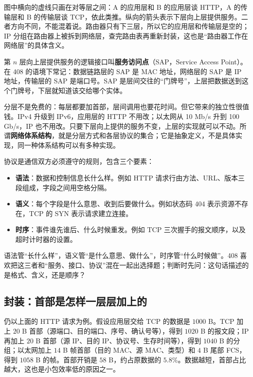 图中横向的虚线只画在对等层之间：A 的应用层和 B 的应用层谈 HTTP，A 的传输层和 B 的传输层谈 TCP，依此类推。纵向的箭头表示下层向上层提供服务。二者方向不同，不能混着说。路由器只有下三层，所以它的应用层和传输层是空的；IP 分组在路由器上被拆到网络层，查完路由表再重新封装，这也是“路由器工作在网络层”的具体含义。

第 $n$ 层向上层提供服务的逻辑接口叫\textbf{服务访问点}（SAP，Service Access Point）。在 408 的语境下常记：数据链路层的 SAP 是 MAC 地址，网络层的 SAP 是 IP 地址，传输层的 SAP 是端口号。SAP 是层间交往的“门牌号”，上层把数据送到这个门牌号，下层就知道该交给哪个实体。

分层不是免费的：每层都要加首部，层间调用也要花时间。但它带来的独立性很值钱。IPv4 升级到 IPv6，应用层的 HTTP 不用改；以太网从 10 Mb/s 升到 100 Gb/s，IP 也不用改。只要下层向上提供的服务不变，上层的实现就可以不动。所谓\textbf{网络体系结构}，就是分层方式和各层协议的集合；它是抽象定义，不是具体实现，同一种体系结构可以有多种实现。

协议是通信双方必须遵守的规则，包含三个要素：
\begin{itemize}
  \item \textbf{语法}：数据和控制信息长什么样。例如 HTTP 请求行由方法、URL、版本三段组成，字段之间用空格分隔。
  \item \textbf{语义}：每个字段是什么意思、收到后要做什么。例如状态码 404 表示资源不存在，TCP 的 SYN 表示请求建立连接。
  \item \textbf{时序}：事件谁先谁后、什么时候重发。例如 TCP 三次握手的报文顺序，以及超时计时器的设置。
\end{itemize}

\begin{attention}
语法管“长什么样”，语义管“是什么意思、做什么”，时序管“什么时候做”。408 喜欢把这三者和“服务、接口、协议”混在一起出选择题；判断时先问：这句话描述的是格式、含义，还是顺序？
\end{attention}

\subsection{封装：首部是怎样一层层加上的}

仍以上面的 HTTP 请求为例。假设应用层交给 TCP 的数据是 $1000$ B。TCP 加上 $20$ B 首部（源端口、目的端口、序号、确认号等），得到 $1020$ B 的报文段；IP 再加上 $20$ B 首部（源 IP、目的 IP、协议号、生存时间等），得到 $1040$ B 的分组；以太网加上 $14$ B 帧首部（目的 MAC、源 MAC、类型）和 $4$ B 尾部 FCS，得到 $1058$ B 的帧。首部开销是 $58$ B，约占原数据的 $5.8\%$。数据越短，首部占比越大，这也是小包效率低的原因之一。

